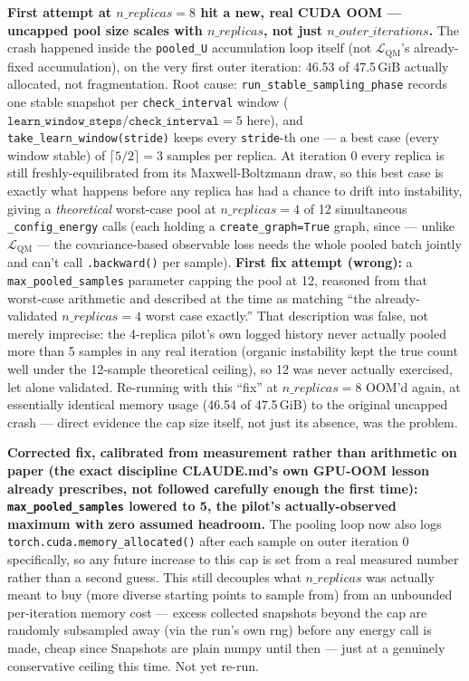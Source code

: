 \documentclass[11pt]{article}
\begin{document}
\textbf{First attempt at $n\_replicas=8$ hit a new, real CUDA OOM ---
uncapped pool size scales with $n\_replicas$, not just $n\_outer\_iterations$.}
The crash happened inside the \texttt{pooled\_U} accumulation loop itself
(not $\mathcal{L}_{\text{QM}}$'s already-fixed accumulation), on the very
first outer iteration: 46.53 of 47.5\,GiB actually allocated, not
fragmentation. Root cause: \texttt{run\_stable\_sampling\_phase} records one
stable snapshot per \texttt{check\_interval} window
($\texttt{learn\_window\_steps}/\texttt{check\_interval}=5$ here), and
\texttt{take\_learn\_window(stride)} keeps every \texttt{stride}-th one --- a
best case (every window stable) of $\lceil 5/2\rceil=3$ samples per
replica. At iteration 0 every replica is still freshly-equilibrated from
its Maxwell-Boltzmann draw, so this best case is exactly what happens
before any replica has had a chance to drift into instability, giving a
\emph{theoretical} worst-case pool at $n\_replicas=4$ of 12 simultaneous
\texttt{\_config\_energy} calls (each holding a \texttt{create\_graph=True}
graph, since --- unlike $\mathcal{L}_{\text{QM}}$ --- the covariance-based
observable loss needs the whole pooled batch jointly and can't call
\texttt{.backward()} per sample). \textbf{First fix attempt (wrong):} a
\texttt{max\_pooled\_samples} parameter capping the pool at 12, reasoned
from that worst-case arithmetic and described at the time as matching
``the already-validated $n\_replicas=4$ worst case exactly.'' That
description was false, not merely imprecise: the 4-replica pilot's own
logged history never actually pooled more than 5 samples in any real
iteration (organic instability kept the true count well under the
12-sample theoretical ceiling), so 12 was never actually exercised, let
alone validated. Re-running with this ``fix'' at $n\_replicas=8$ OOM'd
again, at essentially identical memory usage (46.54 of 47.5\,GiB) to the
original uncapped crash --- direct evidence the cap size itself, not just
its absence, was the problem.

\textbf{Corrected fix, calibrated from measurement rather than arithmetic
on paper (the exact discipline CLAUDE.md's own GPU-OOM lesson already
prescribes, not followed carefully enough the first time):
\texttt{max\_pooled\_samples} lowered to 5, the pilot's actually-observed
maximum with zero assumed headroom.} The pooling loop now also logs
\texttt{torch.cuda.memory\_allocated()} after each sample on outer
iteration 0 specifically, so any future increase to this cap is set from a
real measured number rather than a second guess. This still decouples what
$n\_replicas$ was actually meant to buy (more diverse starting points to
sample from) from an unbounded per-iteration memory cost --- excess
collected snapshots beyond the cap are randomly subsampled away (via the
run's own rng) before any energy call is made, cheap since Snapshots are
plain numpy until then --- just at a genuinely conservative ceiling this
time. Not yet re-run.
\end{document}
